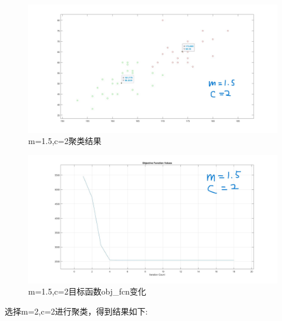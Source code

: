\documentclass{article}
\begin{document}
\begin{figure}[H]
    \centering
    \includegraphics[width=1\textwidth]{image/Figure10_1.jpg}
    \caption{m=1.5,c=2聚类结果}
    \label{Figure10_1}
\end{figure}
\begin{figure}[H]
    \centering
    \includegraphics[width=1\textwidth]{image/Figure10_2.jpg}
    \caption{m=1.5,c=2目标函数obj\_fcn变化}
    \label{Figure10_2}
\end{figure}

选择m=2,c=2进行聚类，得到结果如下:
\end{document}
